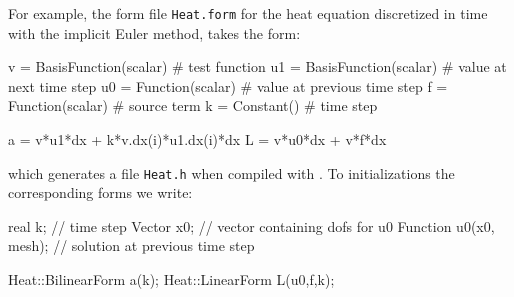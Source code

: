 For example, the form file \texttt{Heat.form} for the heat equation 
discretized in time with the implicit Euler method, takes the form: 
\begin{code}
v           = BasisFunction(scalar) # test function
u1          = BasisFunction(scalar) # value at next time step
u0          = Function(scalar)      # value at previous time step
f           = Function(scalar)      # source term
k           = Constant()            # time step

a = v*u1*dx + k*v.dx(i)*u1.dx(i)*dx 
L = v*u0*dx + v*f*dx 
\end{code}
which generates a file \texttt{Heat.h} when compiled with \ffc{}. 
To initializations the corresponding forms we write:  
\begin{code}
real k;                  // time step
Vector x0;               // vector containing dofs for u0
Function u0(x0, mesh);   // solution at previous time step 

Heat::BilinearForm a(k);
Heat::LinearForm L(u0,f,k);
\end{code}



